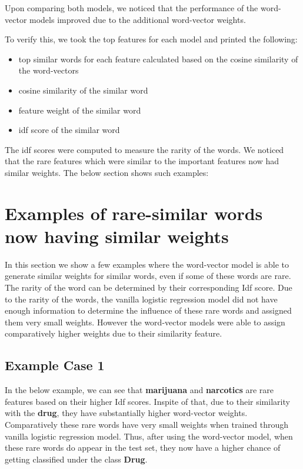 Upon comparing both models, we noticed that the performance of the word-vector models improved due to the additional word-vector weights.

To verify this, we took the top features for each model and printed the following:

\begin{itemize}
\item top similar words for each feature calculated based on the cosine similarity of the word-vectors

\item cosine similarity of the similar word

\item feature weight of the similar word

\item idf score of the similar word
\end{itemize}

The idf scores were computed to measure the rarity of the words. We noticed that the rare features which were similar to the important features now had similar weights. The below section shows such examples:

\newpage
\section{Examples of rare-similar words now having similar weights}

In this section we show a few examples where the word-vector model is able to generate similar weights for similar words, even if some of these words are rare. The rarity of the word can be determined by their corresponding Idf score. Due to the rarity of the words, the vanilla logistic regression model did not have enough information to determine the influence of these rare words and assigned them very small weights. However the word-vector models were able to assign comparatively higher weights due to their similarity feature.

\subsection{Example Case 1}

In the below example, we can see that \textbf{marijuana} and \textbf{narcotics} are rare features based on their higher Idf scores. Inspite of that, due to their similarity with the \textbf{drug}, they have substantially higher word-vector weights. Comparatively these rare words have very small weights when trained through vanilla logistic regression model. Thus, after using the word-vector model, when these rare words do appear in the test set, they now have a higher chance of getting classified under the class \textbf{Drug}.

